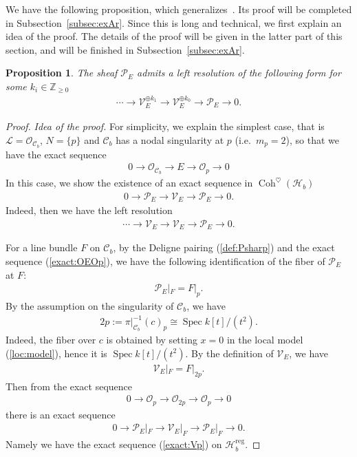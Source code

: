 \documentclass[11pt,oneside,a4paper,mathscr]{amsart}
\newtheorem{prop}[thm]{Proposition}
\theoremstyle{definition}
\renewcommand{\geq}{\geqslant}
\newcommand{\cH}{\mathcal{H}}
\newcommand{\cL}{\mathcal{L}}
\newcommand{\cC}{\mathcal{C}}
\newcommand{\cP}{\mathcal{P}}
\newcommand{\cO}{\mathcal{O}}
\newcommand{\Coh}{\operatorname{Coh}}
\newcommand{\Spec}{\operatorname{Spec}}
\begin{document}
We have the following proposition, which generalizes~\cite[Corollary~5.12]{TodaGL2}.
Its proof will be completed in Subsection~\ref{subsec:exAr}. 
Since this is long and technical, we first explain an idea of the proof.
The details of the proof will be given in the latter part of this section, 
and will be finished in Subsection~\ref{subsec:exAr}.
\begin{prop}\label{prop:resol}
The sheaf $\cP_E$ admits a left resolution of the following form for some $k_i \in \mathbb{Z}_{\geq 0}$
    \begin{align}\label{resol:VE}
        \cdots \to \mathcal{V}_E^{\oplus k_1} \to \mathcal{V}_E^{\oplus k_0} \to \mathcal{P}_E \to 0.
    \end{align}
\end{prop}
\begin{proof}
\textit{Idea of the proof.}
For simplicity, we explain the simplest case, that is $\cL=\cO_{\cC_b}$, $N=\{p\}$
and $\cC_b$ has a nodal singularity at $p$ (i.e.\ $m_p=2$), 
so that we have the exact sequence 
\begin{align}\label{exact:OEOp}
    0\to \cO_{\cC_b} \to E \to \cO_{p} \to 0
\end{align}
In this case, we show the existence of an exact sequence in $\Coh^{\heartsuit}(\cH_b)$
\begin{align}\label{exact:Vp}
0\to \cP_E \to \mathcal{V}_E \to \cP_E \to 0.
\end{align}
Indeed, then we have the left resolution 
\begin{align*}
    \cdots \to \mathcal{V}_E \to \mathcal{V}_E \to \cP_E \to 0.
\end{align*}

For a line bundle $F$ on $\cC_b$, by the Deligne pairing (\ref{def:Psharp}) and the exact sequence (\ref{exact:OEOp}),
we have the following identification of the fiber of $\cP_E$ at $F$: 
    \begin{align}\label{left:res}
        \mathcal{P}_E|_{F}=F|_{p}.
    \end{align}
    By the assumption on the singularity of $\cC_b$, 
    we have
    \begin{align*}
        2p:=\pi|_{\cC_b}^{-1}(c)_p \cong \Spec k[t]/(t^2).
    \end{align*}
     Indeed, the fiber over $c$ is obtained by setting $x=0$ in the local model (\ref{loc:model}), hence it is $\Spec k[t]/(t^2)$.
    By the definition of $\mathcal{V}_E$, we have 
    \begin{align*}
        \mathcal{V}_E|_{F}=F|_{2p}.
    \end{align*}
Then from the exact sequence 
\begin{align*}
0\to \cO_p \to \cO_{2p} \to \cO_p \to 0
\end{align*}
there is an exact sequence 
\begin{align}\label{exact:F}
    0\to \cP_E|_{F} \to \mathcal{V}_E|_{F} \to \cP_E|_{F} \to 0.
\end{align}
Namely we have the exact sequence (\ref{exact:Vp}) on $\cH_b^{\mathrm{reg}}$. 


\end{proof}
\end{document}
